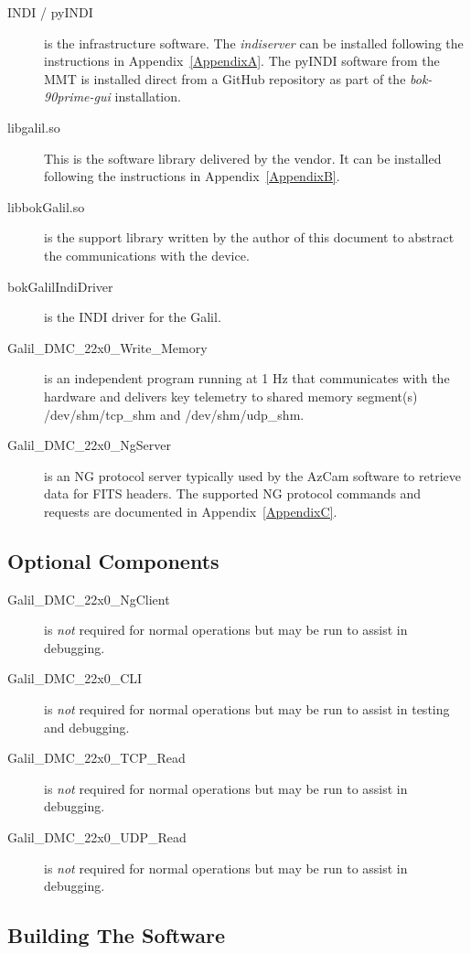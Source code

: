 \documentclass[12pt,twoside]{article}
\begin{document}
\begin{description}
 \item[INDI / pyINDI] is the infrastructure software. The \emph{indiserver} can be installed following the instructions in
       Appendix~\ref{AppendixA}. The pyINDI software from the MMT is installed direct from a GitHub repository as part of
       the \emph{bok-90prime-gui} installation.
 \item[libgalil.so] This is the software library delivered by the vendor. It can be installed following the instructions in
       Appendix~\ref{AppendixB}.
 \item[libbokGalil.so] is the support library written by the author of this document to abstract the communications
      with the device.
 \item[bokGalilIndiDriver] is the INDI driver for the Galil.
 \item[Galil\_DMC\_22x0\_Write\_Memory] is an independent program running at 1 Hz that communicates with the 
       hardware and delivers key telemetry to shared memory segment(s) /dev/shm/tcp\_shm and /dev/shm/udp\_shm.
 \item[Galil\_DMC\_22x0\_NgServer] is an NG protocol server typically used by the AzCam software to retrieve data for FITS
      headers. The supported NG protocol commands and requests are documented in Appendix~\ref{AppendixC}.
\end{description}

\subsection{Optional Components}
\label{optionalcomponents}

\begin{description}
 \item[Galil\_DMC\_22x0\_NgClient] is \emph{not} required for normal operations but may be run to assist in debugging.
 \item[Galil\_DMC\_22x0\_CLI] is \emph{not} required for normal operations but may be run to assist in testing and debugging.
 \item[Galil\_DMC\_22x0\_TCP\_Read] is \emph{not} required for normal operations but may be run to assist in debugging.
 \item[Galil\_DMC\_22x0\_UDP\_Read] is \emph{not} required for normal operations but may be run to assist in debugging.
\end{description}

\subsection{Building The Software}
\label{buildingthesoftware}
\end{document}
